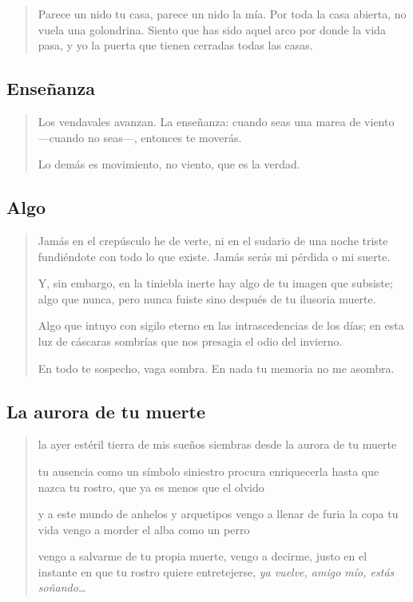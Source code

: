\documentclass[a4paper, 12pt]{article}
\begin{document}
\begin{verse}
Parece un nido tu casa,
parece un nido la mía.
Por toda la casa abierta,
no vuela una golondrina.
Siento que has sido aquel arco
por donde la vida pasa,
y yo la puerta que tienen
cerradas todas las casas.
\end{verse}


\pagebreak

\subsection{Enseñanza}
\begin{verse}
Los vendavales avanzan.
La enseñanza:
cuando seas una marea
de viento —cuando no seas—,
entonces te moverás.

Lo demás es movimiento,
no viento, que es la verdad.
\end{verse}

\pagebreak
\subsection{Algo}

\begin{verse}
    
Jamás en el crepúsculo he de verte,
ni en el sudario de una noche triste
fundiéndote con todo lo que existe.
Jamás serás mi pérdida o mi suerte.
~ 

Y, sin embargo, en la tiniebla inerte
hay algo de tu imagen que subsiste;
algo que nunca, pero nunca fuiste 
sino después de tu ilusoria muerte.
~ 

Algo que intuyo con sigilo eterno
en las intrascedencias de los días;
en esta luz de cáscaras sombrías
que nos presagia el odio del invierno.
~ 

En todo te sospecho, vaga sombra.
En nada tu memoria no me asombra.


\end{verse}

\pagebreak
\subsection{La aurora de tu muerte}

\begin{verse}

la ayer estéril tierra de mis sueños 
siembras desde la aurora de tu muerte
~ 

tu ausencia como un símbolo siniestro
procura enriquecerla hasta que nazca 
tu rostro, que ya es menos que el olvido
~

y a este mundo de anhelos y arquetipos
vengo a llenar de furia la copa tu vida
vengo a morder el alba como un perro 
~ 

vengo a salvarme de tu propia muerte,
vengo a decirme, justo en el instante
en que tu rostro quiere entretejerse, 
\textit{ya vuelve, amigo mío, estás soñando\ldots}



\end{verse}
\end{document}
